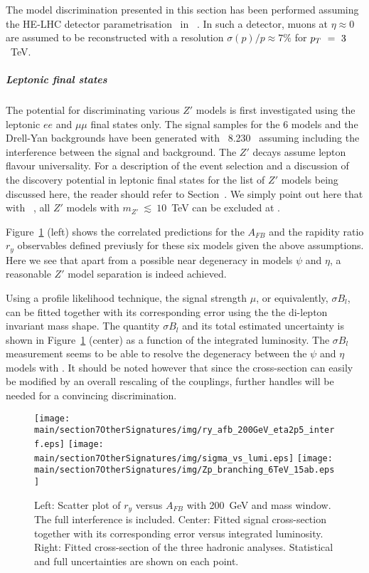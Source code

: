The model discrimination presented in this section has been performed assuming the HE-LHC detector parametrisation~\cite{hlhelhc_web} in \delphes~\cite{deFavereau:2013fsa}. In such a detector, muons at $\eta \approx 0$ are assumed to be reconstructed with a resolution $\sigma(p)/p \approx 7\%$ for $p_{T}~=~3 $~TeV.

\subparagraph*{Leptonic final states}
\label{par:lepana}

The potential for discriminating various $Z'$ models is first investigated using the leptonic $ee$ and $\mu\mu$ final states only. The signal samples for the 6 models and the Drell-Yan backgrounds have been generated with \pythia~8.230~\cite{Sjostrand:2014zea} assuming including the interference between the signal and background. The $Z'$ decays assume lepton flavour universality. For a description of the event selection and a discussion of the discovery potential in leptonic final states for the list of $Z'$ models being discussed here, the reader should refer to Section~\cite{subsubsec:hr_lep}. We simply point out here that with \intlumihelhc\ , all $Z'$ models with $m_{Z'}~\lesssim~10$~TeV can be excluded at \sqrtshelhc.

Figure~\ref{fig:ana:res} (left) shows the correlated predictions for the $A_{FB}$ and the rapidity ratio $r_y$ observables defined previusly for these six models given the above assumptions. Here we see that apart from a possible near degeneracy in models $\psi$ and $\eta$, a reasonable $Z'$ model separation is indeed achieved.

Using a profile likelihood technique, the signal strength $\mu$, or equivalently, $\sigma B_l$, can be fitted together with its corresponding error using the the di-lepton invariant mass shape. The quantity $\sigma B_l$ and its total estimated uncertainty is shown in Figure~\ref{fig:ana:res} (center) as a function of the integrated luminosity. The $\sigma B_l$ measurement seems to be able to resolve the degeneracy between the $\psi$ and $\eta$ models with \intlumihelhc. It should be noted however that since the cross-section can easily be modified by an overall rescaling of the couplings, further handles will be needed for a convincing discrimination.

\begin{figure}[!htb]
  \centering
   \texttt{[image: \\main/section7OtherSignatures/img/ry\_afb\_200GeV\_eta2p5\_interf.eps]}
   \texttt{[image: \\main/section7OtherSignatures/img/sigma\_vs\_lumi.eps]}
   \texttt{[image: \\main/section7OtherSignatures/img/Zp\_branching\_6TeV\_15ab.eps]}
  \caption{Left: Scatter plot of $r_y$ versus $A_{FB}$ with 200~GeV and mass window. The full interference is included. Center: Fitted signal cross-section together with its corresponding error versus integrated luminosity. Right: Fitted cross-section of the three hadronic analyses. Statistical and full uncertainties are shown on each point.}
  \label{fig:ana:res}
\end{figure}

